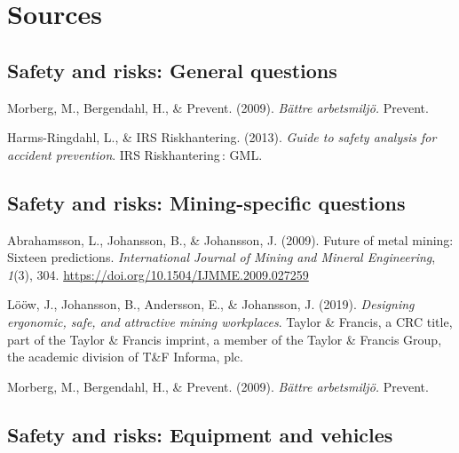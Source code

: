 \documentclass[
  12pt,
]{scrbook}
\newenvironment{cslreferences}%
  {}%
  {\par}
\begin{document}
\hypertarget{sources}{%
\section*{Sources}\label{sources}}

\hypertarget{safety-and-risks-general-questions-1}{%
\subsection*{Safety and risks: General questions}\label{safety-and-risks-general-questions-1}}

\indent
  \setlength{\parindent}{-0.2in}

\setlength{\leftskip}{0.2in} \setlength{\parskip}{0.25em}

\hypertarget{refs}{}
\begin{cslreferences}
\end{cslreferences}

Morberg, M., Bergendahl, H., \& Prevent. (2009). \emph{Bättre arbetsmiljö.}
Prevent.

Harms-Ringdahl, L., \& IRS Riskhantering. (2013). \emph{Guide to safety
analysis for accident prevention}. IRS Riskhantering\,: GML.

\hypertarget{safety-and-risks-mining-specific-questions-1}{%
\subsection*{Safety and risks: Mining-specific questions}\label{safety-and-risks-mining-specific-questions-1}}

Abrahamsson, L., Johansson, B., \& Johansson, J. (2009). Future of metal
mining: Sixteen predictions. \emph{International Journal of Mining and
Mineral Engineering}, \emph{1}(3), 304.
\url{https://doi.org/10.1504/IJMME.2009.027259}

Lööw, J., Johansson, B., Andersson, E., \& Johansson, J. (2019).
\emph{Designing ergonomic, safe, and attractive mining workplaces}. Taylor \&
Francis, a CRC title, part of the Taylor \& Francis imprint, a member of
the Taylor \& Francis Group, the academic division of T\&F Informa, plc.

Morberg, M., Bergendahl, H., \& Prevent. (2009). \emph{Bättre arbetsmiljö.}
Prevent.

\hypertarget{safety-and-risks-equipment-and-vehicles-1}{%
\subsection*{Safety and risks: Equipment and vehicles}\label{safety-and-risks-equipment-and-vehicles-1}}
\end{document}
